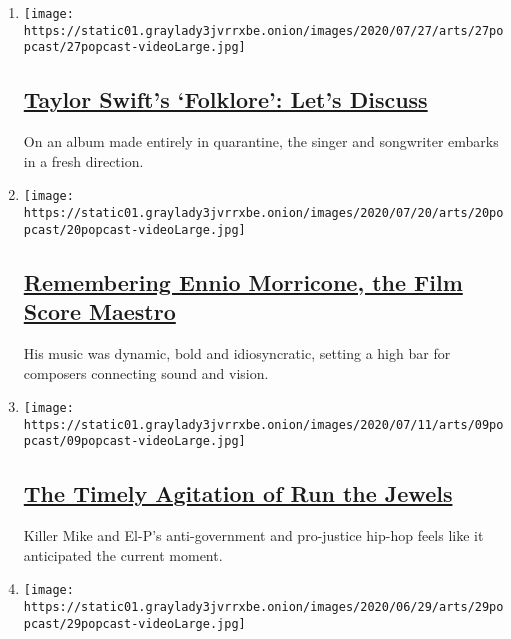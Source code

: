 \begin{enumerate}
\def\labelenumi{\arabic{enumi}.}
\item
  \texttt{[image: https://static01.graylady3jvrrxbe.onion/images/2020/07/27/arts/27popcast/27popcast-videoLarge.jpg]}

  \hypertarget{taylor-swifts-folklore-lets-discuss}{%
  \subsection{\texorpdfstring{\href{/2020/07/27/arts/music/popcast-taylor-swift-folklore.html}{Taylor
  Swift's `Folklore': Let's
  Discuss}}{Taylor Swift's `Folklore': Let's Discuss}}\label{taylor-swifts-folklore-lets-discuss}}

  On an album made entirely in quarantine, the singer and songwriter
  embarks in a fresh direction.
\item
  \texttt{[image: https://static01.graylady3jvrrxbe.onion/images/2020/07/20/arts/20popcast/20popcast-videoLarge.jpg]}

  \hypertarget{remembering-ennio-morricone-the-film-score-maestro}{%
  \subsection{\texorpdfstring{\href{/2020/07/20/arts/music/popcast-ennio-morricone.html}{Remembering
  Ennio Morricone, the Film Score
  Maestro}}{Remembering Ennio Morricone, the Film Score Maestro}}\label{remembering-ennio-morricone-the-film-score-maestro}}

  His music was dynamic, bold and idiosyncratic, setting a high bar for
  composers connecting sound and vision.
\item
  \texttt{[image: https://static01.graylady3jvrrxbe.onion/images/2020/07/11/arts/09popcast/09popcast-videoLarge.jpg]}

  \hypertarget{the-timely-agitation-of-run-the-jewels}{%
  \subsection{\texorpdfstring{\href{/2020/07/09/arts/music/popcast-run-the-jewels.html}{The
  Timely Agitation of Run the
  Jewels}}{The Timely Agitation of Run the Jewels}}\label{the-timely-agitation-of-run-the-jewels}}

  Killer Mike and El-P's anti-government and pro-justice hip-hop feels
  like it anticipated the current moment.
\item
  \texttt{[image: https://static01.graylady3jvrrxbe.onion/images/2020/06/29/arts/29popcast/29popcast-videoLarge.jpg]}


\end{enumerate}
